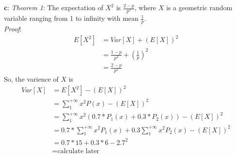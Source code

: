 \documentclass[12pt,letterpaper]{article}
\begin{document}
    \textbf{c}: \textit{Theorem 1}: The expectation of $X^{2}$ is $\frac{2 - p}{p^{2}}$, where $X$ is a geometric random variable ranging from 1 to infinity with mean $\frac{1}{p}$. \\
    \textit{Proof}:
        \begin{equation*}
            \begin{aligned}
                E[X^{2}] &= Var[X] + (E[X])^{2} \\
                &= \frac{1 - p}{p^{2}} + (\frac{1}{p})^{2} \\
                &= \frac{2 - p}{p^{2}}
            \end{aligned}
        \end{equation*}
    So, the varience of $X$ is
        \begin{equation*}
            \begin{aligned}
                Var[X] &= E[X^{2}] - (E[X])^{2} \\
                &= \sum_{1}^{+\infty} x^{2}P(x) - (E[X])^{2} \\
                &= \sum_{1}^{+\infty} x^{2}(0.7 * P_{1}(x) + 0.3 * P_{2}(x)) - (E[X])^{2} \\
                &= 0.7 * \sum_{1}^{+\infty} x^{2}P_{1}(x) + 0.3 \sum_{1}^{+\infty} x^{2}P_{2}(x) - (E[X])^{2} \\
                &= 0.7 * 15 + 0.3 * 6 - 2.7^{2} \\
                &= \mbox{calculate later}
            \end{aligned}
        \end{equation*}
\end{document}

